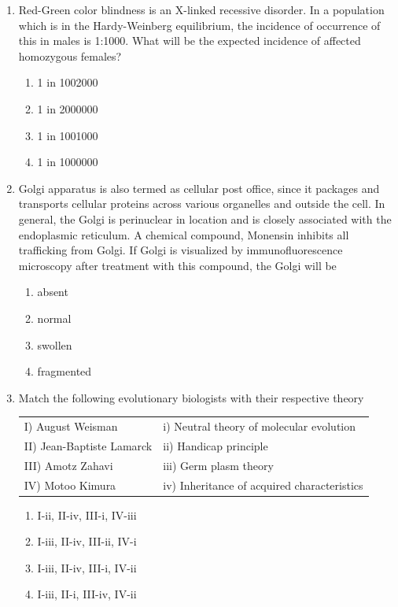 \documentclass[journal,12pt,onecolumn]{IEEEtran}
\begin{document}
\begin{enumerate}[label=\arabic*.]
\item Red-Green color blindness is an X-linked recessive disorder. In a population which is in the Hardy-Weinberg equilibrium, the incidence of occurrence of this in males is 1:1000. What will be the expected incidence of affected homozygous females?
\begin{multicols}{4}
\begin{enumerate}[label=(\Alph*)]
\item 1 in 1002000
\item 1 in 2000000
\item 1 in 1001000
\item 1 in 1000000
\end{enumerate}
\end{multicols}

\item Golgi apparatus is also termed as cellular post office, since it packages and transports cellular proteins across various organelles and outside the cell. In general, the Golgi is perinuclear in location and is closely associated with the endoplasmic reticulum. A chemical compound, Monensin inhibits all trafficking from Golgi. If Golgi is visualized by immunofluorescence microscopy after treatment with this compound, the Golgi will be
\begin{multicols}{4}
\begin{enumerate}[label=(\Alph*)]
\item absent
\item normal
\item swollen
\item fragmented
\end{enumerate}
\end{multicols}

\item Match the following evolutionary biologists with their respective theory
\begin{center}
\begin{tabular}{p{5cm}p{6cm}}
I) August Weisman & i) Neutral theory of molecular evolution \\
II) Jean-Baptiste Lamarck & ii) Handicap principle \\
III) Amotz Zahavi & iii) Germ plasm theory \\
IV) Motoo Kimura & iv) Inheritance of acquired characteristics \\
\end{tabular}
\end{center}
\begin{multicols}{2}
\begin{enumerate}[label=(\Alph*)]
\item I-ii, II-iv, III-i, IV-iii
\item I-iii, II-iv, III-ii, IV-i
\item I-iii, II-iv, III-i, IV-ii
\item I-iii, II-i, III-iv, IV-ii
\end{enumerate}
\end{multicols}


\end{enumerate}
\end{document}
